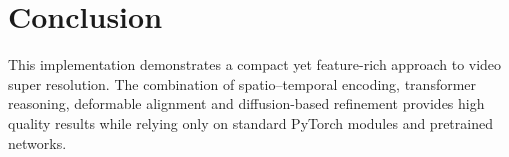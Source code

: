 \documentclass{article}
\begin{document}
\section{Conclusion}
This implementation demonstrates a compact yet feature-rich approach to video super resolution. The combination of spatio--temporal encoding, transformer reasoning, deformable alignment and diffusion-based refinement provides high quality results while relying only on standard PyTorch modules and pretrained networks.
\end{document}
